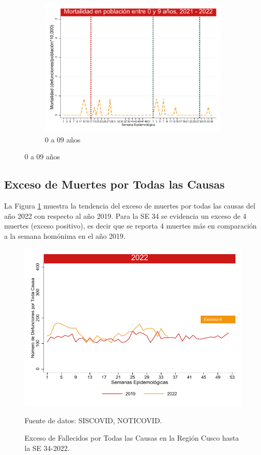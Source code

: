 \documentclass[12pt,a4paper,openany]{book}
\begin{document}
\begin{figure}[h]
		\vspace{10mm}
		\begin{subfigure}[b]{0.45\textwidth}
			\centering
			\includegraphics[width=\textwidth]{../figuras/mortalidad_edad_0.pdf}
			\caption{0 a 09 años}
		\end{subfigure}
	\end{figure}
	\clearpage	
	\subsection*{Exceso de Muertes por Todas las Causas}
	\noindent La Figura \ref{fig:exceso_regional} muestra la tendencia del exceso de muertes por todas las causas del año 2022 con respecto al año 2019.  Para la SE 34 se evidencia un exceso de 4 muertes (exceso positivo), es
	decir que se reporta 4 muertes más en comparación a la semana homónima en el año 2019.
	
	
	
	\begin{figure}[h]
		\caption{Exceso de Fallecidos por Todas las Causas en la Región Cusco hasta la SE 34-2022.}\label{fig:exceso_regional}
		\begin{center}
			\includegraphics[width=0.85\linewidth]{../figuras/exceso_region_2022.pdf}
		\end{center}
		{\footnotesize {Fuente de datos: SISCOVID, NOTICOVID.}}
	\end{figure}
	\clearpage
	
\end{document}
